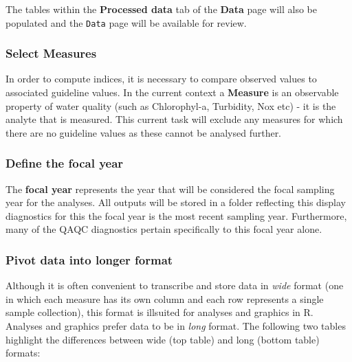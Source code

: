 \documentclass[
  8pt,
  a4paper]{article}
\begin{document}
The tables within the \textbf{Processed data} tab of the \textbf{Data}
page will also be populated and the \texttt{Data} page will be available
for review.

\subsubsection{Select Measures}\label{select-measures}

In order to compute indices, it is necessary to compare observed values
to associated guideline values. In the current context a
\textbf{Measure} is an observable property of water quality (such as
Chlorophyl-a, Turbidity, Nox etc) - it is the analyte that is measured.
This current task will exclude any measures for which there are no
guideline values as these cannot be analysed further.

\subsubsection{Define the focal year}\label{define-the-focal-year}

The \textbf{focal year} represents the year that will be considered the
focal sampling year for the analyses. All outputs will be stored in a
folder reflecting this display diagnostics for this the focal year is
the most recent sampling year. Furthermore, many of the QAQC diagnostics
pertain specifically to this focal year alone.

\subsubsection{Pivot data into longer
format}\label{pivot-data-into-longer-format}

Although it is often convenient to transcribe and store data in
\emph{wide} format (one in which each measure has its own column and
each row represents a single sample collection), this format is
illsuited for analyses and graphics in R. Analyses and graphics prefer
data to be in \emph{long} format. The following two tables highlight the
differences between wide (top table) and long (bottom table) formats:
\end{document}
